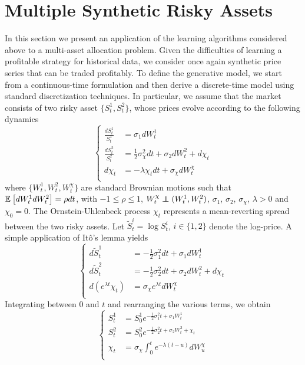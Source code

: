 \section{Multiple Synthetic Risky Assets}
In this section we present an application of the learning algorithms considered above to a multi-asset allocation problem. Given the difficulties of learning a profitable strategy for historical data, we consider once again synthetic price series that can be traded profitably. To define the generative model, we start from a continuous-time formulation and then derive a discrete-time model using standard discretization techniques. In particular, we assume that the market consists of two risky asset $\{S_t^1, S_t^2\}$, whose prices evolve according to the following dynamics
\begin{equation}
	\begin{cases}
		\frac{dS_t^1}{S_t^1} &= \sigma_1 dW_t^1\\ 
		\frac{dS_t^2}{S_t^2} &= \frac{1}{2} \sigma_\chi^2 dt + \sigma_2 dW_t^2 + d\chi_t\\
		d\chi_t &= -\lambda \chi_t dt + \sigma_\chi dW_t^\chi\\
	\end{cases}
\end{equation}
where $\{W_t^1, W_t^2, W_t^\chi\}$ are standard Brownian motions such that $\mathbb{E}_{}\left[ dW_t^1 dW_t^2 \right] = \rho dt$, with $-1 \leq \rho \leq 1$, $W_t^\chi \independent (W_t^1, W_t^2)$, 
$\sigma_1$, $\sigma_2$, $\sigma_\chi$, $\lambda >0$ and $\chi_0 = 0$. The Ornstein-Uhlenbeck process $\chi_t$ represents a mean-reverting spread between the two risky assets. Let $\widetilde{S}_t^i = \log S_t^i$, $i \in \{1,2\}$ denote the log-price. A simple application of Itô's lemma yields 
\begin{equation}
	\label{eq:sde}
	\begin{cases}
		d\widetilde{S}_t^1 &= -\frac{1}{2} \sigma_1^2 dt + \sigma_1 dW_t^1\\ 
		d\widetilde{S}_t^2 &= -\frac{1}{2} \sigma_2^2 dt + \sigma_2 dW_t^2 + d\chi_t\\
		d(e^{\lambda t} \chi_t) &= \sigma_\chi e^{\lambda t} dW_t^\chi\\
	\end{cases}
\end{equation}
Integrating between $0$ and $t$ and rearranging the various terms, we obtain
\begin{equation}
	\label{eq:sol_sde}
	\begin{cases}
		S_t^1 &= S_0^1 e^{-\frac{1}{2} \sigma_1^2 t + \sigma_1 W_t^1}\\ 
		S_t^2 &= S_0^2 e^{-\frac{1}{2} \sigma_2^2 t + \sigma_2 W_t^2 + \chi_t}\\
		\chi_t &= \sigma_\chi \int_0^t e^{-\lambda (t-u)} dW_u^\chi\\
	\end{cases}
\end{equation}
